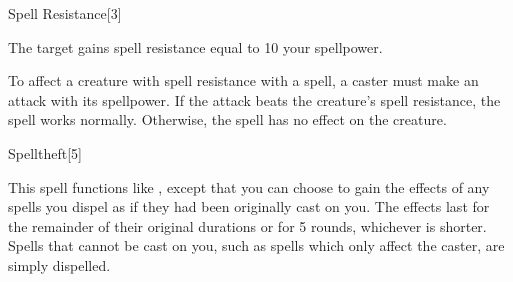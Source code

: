 \begin{spellsection}{Spell Resistance}[3]
    \begin{spellheader}
    \end{spellheader}
    \begin{spellcontent}
        \begin{spelltargetinginfo}
        \end{spelltargetinginfo}
        \begin{spelleffects}
            \spelleffect The target gains spell resistance equal to 10 \add your spellpower.
            \spelldur \durshort
        \end{spelleffects}
    \end{spellcontent}
    \begin{spellfooter}
        \spellnotes To affect a creature with spell resistance with a spell, a caster must make an attack with its spellpower. If the attack beats the creature's spell resistance, the spell works normally. Otherwise, the spell has no effect on the creature.
        \miscastrandom
    \end{spellfooter}
\end{spellsection}

\begin{spellsection}{Spelltheft}[5]
    \begin{spellheader}
    \end{spellheader}
    \begin{spellcontent}
        \spellspecial This spell functions like , except that you can choose to gain the effects of any spells you dispel as if they had been originally cast on you. The effects last for the remainder of their original durations or for 5 rounds, whichever is shorter. Spells that cannot be cast on you, such as spells which only affect the caster, are simply dispelled.
    \end{spellcontent}
    \begin{spellfooter}
        \miscastrandom
    \end{spellfooter}
\end{spellsection}

